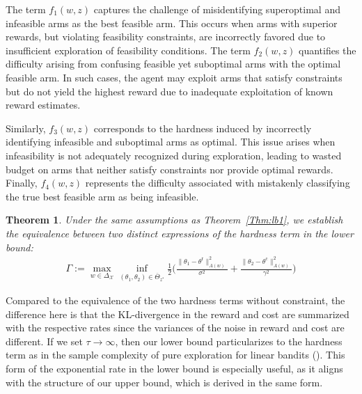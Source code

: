 \documentclass[accepted]{uai2025} %
\theoremstyle{plain}
\newtheorem{theorem}{Theorem}[section]
\theoremstyle{definition}
\theoremstyle{remark}
\newcommand{\thetac}{\theta^{\mathrm{c}}}
\newcommand{\thetar}{\theta^{\mathrm{r}}}
\begin{document}
The term $f_1(w, z)$ captures the challenge of misidentifying superoptimal and infeasible arms as the best feasible arm. This occurs when arms with superior rewards, but violating feasibility constraints, are incorrectly favored due to insufficient exploration of feasibility conditions. The term $f_2(w, z)$ quantifies the difficulty arising from confusing feasible yet suboptimal arms with the optimal feasible arm. In such cases, the agent may exploit arms that satisfy constraints but do not yield the highest reward due to inadequate exploitation of known reward estimates.

Similarly, $f_3(w, z)$ corresponds to the hardness induced by incorrectly identifying infeasible and suboptimal arms as optimal. This issue arises when infeasibility is not adequately recognized during exploration, leading to wasted budget on arms that neither satisfy constraints nor provide optimal rewards. Finally, $f_4(w, z)$ represents the difficulty associated with mistakenly classifying the true best feasible arm as  being infeasible. 


\begin{theorem}
\label{Thm:equ_lowerboundterm}
  Under the same assumptions as Theorem~\ref{Thm:lb1}, we establish the equivalence between two distinct expressions of the hardness term in the lower bound:
  \begin{align*}
      \Gamma\!:=\!\max_{w\in \Delta_\mathcal{X}}\!\inf_{(\theta_1, \theta_2)\in\overline{\Theta}_{z^*}}\! \frac{1}{2} \bigg(\! \frac{\lVert\theta_1-\thetar\rVert^2_{A(w)^{}}}{\sigma^2}\!+\!\frac{\lVert\theta_2-\thetac\rVert^2_{A(w)^{}}}{\gamma^2}\!\bigg)
  \end{align*}
\end{theorem}

    Compared to the equivalence of the two hardness terms without constraint, the difference here is that the KL-divergence in the reward and cost  are summarized with the respective rates since the variances of the noise in reward and cost are different.
    If we set $\tau\to \infty$, then our lower bound particularizes to the hardness term as in the sample complexity of pure exploration for linear bandits (\cite{jedra2020optimal}). This form of the exponential rate in the lower bound is especially useful, as it aligns with the structure of our upper bound, which is derived in the same form.

    \vspace{-.1in}
\end{document}
